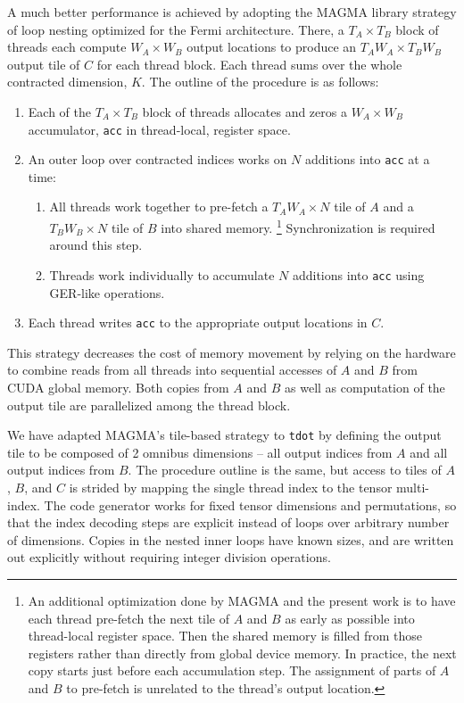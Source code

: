 \documentclass{sigplanconf}
\begin{document}
  A much better performance is achieved by adopting the MAGMA library
strategy of loop nesting optimized for the Fermi architecture.\cite{magma,rnath10}  There, a $T_A \times T_B$ block of threads each
compute $W_A \times W_B$ output locations to produce an $T_A W_A \times T_B W_B$
output tile of $C$ for each thread block.  Each thread sums over the whole contracted
dimension, $K$.  The outline of the procedure is as follows:\cite{rnath10}
\begin{enumerate}
\item Each of the $T_A \times T_B$ block of threads allocates and zeros
a $W_A \times W_B$ accumulator, {\tt acc} in thread-local, register space.
\item An outer loop over contracted indices works on $N$ additions into {\tt acc} at a time:
  \begin{enumerate}
    \item All threads work together to pre-fetch a $T_A W_A \times N$ tile of $A$ and a
    $T_B W_B \times N$ tile of $B$ into shared memory.
    \footnote{  An additional optimization done by MAGMA and the present work
is to have each thread pre-fetch the next tile of $A$ and $B$ as early as possible
into thread-local register space.  Then the shared memory is filled from those registers
rather than directly from global device memory.  In practice, the next copy starts
just before each accumulation step.  The assignment of parts of $A$ and $B$
to pre-fetch is unrelated to the thread's output location.}
    Synchronization is required around this step.
    \item Threads work individually to accumulate $N$ additions into {\tt acc} using GER-like operations.
  \end{enumerate}
  \item Each thread writes {\tt acc} to the appropriate output locations in $C$.
\end{enumerate}

  This strategy decreases the cost of memory movement by relying on the
hardware to combine reads from all threads into sequential
accesses of $A$ and $B$ from CUDA global memory.
Both copies from $A$ and $B$ as well
as computation of the output tile are parallelized among the thread block.

  We have adapted MAGMA's tile-based strategy to {\tt tdot} by defining the output tile
to be composed of 2 omnibus dimensions -- all output indices from $A$
and all output indices from $B$.
The procedure outline is the same, but access to tiles of $A$, $B$, and $C$
is strided by mapping the single thread index to the tensor multi-index.
The code generator works for fixed tensor dimensions and permutations, so that
the index decoding steps are explicit instead of loops over arbitrary number of dimensions.
Copies in the nested inner loops have known sizes, and are written out explicitly
without requiring integer division operations.
\end{document}
